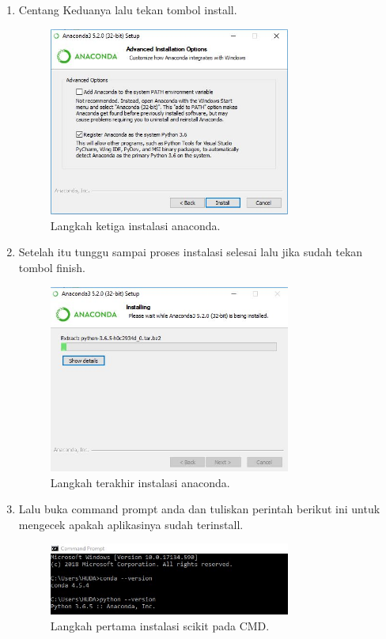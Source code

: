 \begin{enumerate}
\item Centang Keduanya lalu tekan tombol install.
\begin{figure}[ht]\centerline{\includegraphics[width=0.75\textwidth]{figures/4.JPG}}\caption{Langkah ketiga instalasi anaconda.}\end{figure}
\item Setelah itu tunggu sampai proses instalasi selesai lalu jika sudah tekan tombol finish.
\begin{figure}[ht]\centerline{\includegraphics[width=0.75\textwidth]{figures/5.JPG}}\caption{Langkah terakhir instalasi anaconda.}\end{figure}
\item Lalu buka command prompt anda dan tuliskan perintah berikut ini untuk mengecek apakah aplikasinya sudah terinstall.
\begin{figure}[ht]\centerline{\includegraphics[width=0.75\textwidth]{figures/6.JPG}}\caption{Langkah pertama instalasi scikit pada CMD.}\end{figure}

\end{enumerate}
